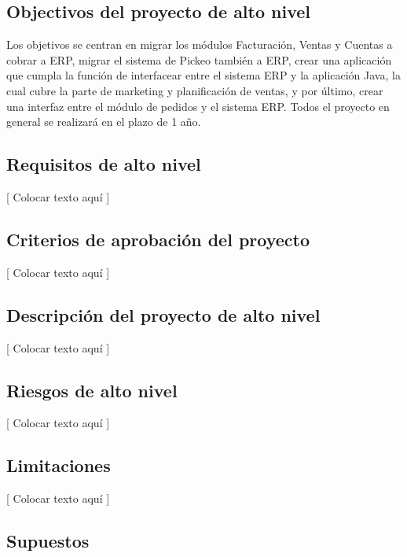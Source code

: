 \documentclass{article}
\begin{document}
\subsection{Objectivos del proyecto de alto nivel}

	Los objetivos se centran en migrar los módulos Facturación, Ventas y Cuentas a cobrar a ERP, migrar el sistema de Pickeo también a ERP, crear una aplicación que cumpla la función de interfacear entre el sistema ERP y la aplicación Java, la cual cubre la parte de marketing y planificación de ventas, y por último, crear una interfaz entre el módulo de pedidos y el sistema ERP. Todos el proyecto en general se realizará en el plazo de 1 año.
\medskip


\subsection{Requisitos de alto nivel}

	[ Colocar texto aquí ]

\medskip


\subsection{Criterios de aprobación del proyecto}

	[ Colocar texto aquí ]

\medskip


\subsection{Descripción del proyecto de alto nivel}

	[ Colocar texto aquí ]

\medskip


\subsection{Riesgos de alto nivel}

	[ Colocar texto aquí ]

\medskip


\subsection{Limitaciones}

	[ Colocar texto aquí ]

\medskip


\subsection{Supuestos}
\end{document}
